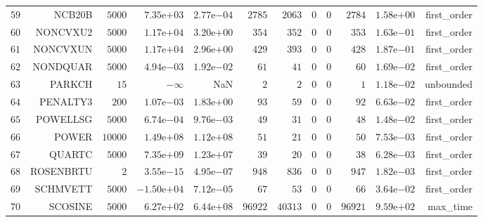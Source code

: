 \begin{longtable}{rrrrrrrrrrrr}
  \(    59\) & NCB20B & \(  5000\) & \( 7.35\)e\(+03\) & \( 2.77\)e\(-04\) & \(  2785\) & \(  2063\) & \(     0\) & \(     0\) & \(  2784\) & \( 1.58\)e\(+00\) & first\_order \\
  \(    60\) & NONCVXU2 & \(  5000\) & \( 1.17\)e\(+04\) & \( 3.20\)e\(+00\) & \(   354\) & \(   352\) & \(     0\) & \(     0\) & \(   353\) & \( 1.63\)e\(-01\) & first\_order \\
  \(    61\) & NONCVXUN & \(  5000\) & \( 1.17\)e\(+04\) & \( 2.96\)e\(+00\) & \(   429\) & \(   393\) & \(     0\) & \(     0\) & \(   428\) & \( 1.87\)e\(-01\) & first\_order \\
  \(    62\) & NONDQUAR & \(  5000\) & \( 4.94\)e\(-03\) & \( 1.92\)e\(-02\) & \(    61\) & \(    41\) & \(     0\) & \(     0\) & \(    60\) & \( 1.69\)e\(-02\) & first\_order \\
  \(    63\) & PARKCH & \(    15\) & \(-\infty\) &       NaN & \(     2\) & \(     2\) & \(     0\) & \(     0\) & \(     1\) & \( 1.18\)e\(-02\) & unbounded \\
  \(    64\) & PENALTY3 & \(   200\) & \( 1.07\)e\(-03\) & \( 1.83\)e\(+00\) & \(    93\) & \(    59\) & \(     0\) & \(     0\) & \(    92\) & \( 6.63\)e\(-02\) & first\_order \\
  \(    65\) & POWELLSG & \(  5000\) & \( 6.74\)e\(-04\) & \( 9.76\)e\(-03\) & \(    49\) & \(    31\) & \(     0\) & \(     0\) & \(    48\) & \( 1.48\)e\(-02\) & first\_order \\
  \(    66\) & POWER & \( 10000\) & \( 1.49\)e\(+08\) & \( 1.12\)e\(+08\) & \(    51\) & \(    21\) & \(     0\) & \(     0\) & \(    50\) & \( 7.53\)e\(-03\) & first\_order \\
  \(    67\) & QUARTC & \(  5000\) & \( 7.35\)e\(+09\) & \( 1.23\)e\(+07\) & \(    39\) & \(    20\) & \(     0\) & \(     0\) & \(    38\) & \( 6.28\)e\(-03\) & first\_order \\
  \(    68\) & ROSENBRTU & \(     2\) & \( 3.55\)e\(-15\) & \( 4.95\)e\(-07\) & \(   948\) & \(   836\) & \(     0\) & \(     0\) & \(   947\) & \( 1.82\)e\(-03\) & first\_order \\
  \(    69\) & SCHMVETT & \(  5000\) & \(-1.50\)e\(+04\) & \( 7.12\)e\(-05\) & \(    67\) & \(    53\) & \(     0\) & \(     0\) & \(    66\) & \( 3.64\)e\(-02\) & first\_order \\
  \(    70\) & SCOSINE & \(  5000\) & \( 6.27\)e\(+02\) & \( 6.44\)e\(+08\) & \( 96922\) & \( 40313\) & \(     0\) & \(     0\) & \( 96921\) & \( 9.59\)e\(+02\) & max\_time \\

\end{longtable}
